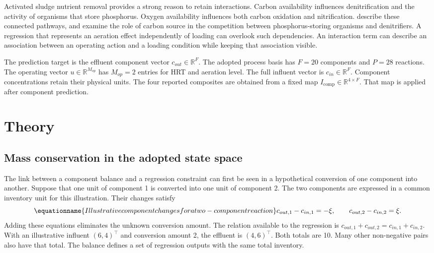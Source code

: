 Activated sludge nutrient removal provides a strong reason to retain interactions. Carbon availability influences denitrification and the activity of organisms that store phosphorus. Oxygen availability influences both carbon oxidation and nitrification. \citet{Wentzel1992} describe these connected pathways, and \citet{Guerrero2011} examine the role of carbon source in the competition between phosphorus-storing organisms and denitrifiers. A regression that represents an aeration effect independently of loading can overlook such dependencies. An interaction term can describe an association between an operating action and a loading condition while keeping that association visible.

The prediction target is the effluent component vector \(c_{out}\in\mathbb{R}^{F}\). The adopted process basis has \(F=20\) components and \(P=28\) reactions. The operating vector \(u\in\mathbb{R}^{M_{op}}\) has \(M_{op}=2\) entries for HRT and aeration level. The full influent vector is \(c_{in}\in\mathbb{R}^{F}\). Component concentrations retain their physical units. The four reported composites are obtained from a fixed map \(I_{\mathrm{comp}}\in\mathbb{R}^{4\times F}\). That map is applied after component prediction.

\section{Theory}

\subsection{Mass conservation in the adopted state space}

The link between a component balance and a regression constraint can first be seen in a hypothetical conversion of one component into another. Suppose that one unit of component 1 is converted into one unit of component 2. The two components are expressed in a common inventory unit for this illustration. Their changes satisfy
\begin{equation}
\equationname{Illustrative component changes for a two-component reaction}
\label{eq:icsor_scalar_inventory_example}
c_{out,1}-c_{in,1}=-\xi,
\qquad
c_{out,2}-c_{in,2}=\xi.
\end{equation}
Adding these equations eliminates the unknown conversion amount. The relation available to the regression is \(c_{out,1}+c_{out,2}=c_{in,1}+c_{in,2}\). With an illustrative influent \((6,4)^\top\) and conversion amount 2, the effluent is \((4,6)^\top\). Both totals are 10. Many other non-negative pairs also have that total. The balance defines a set of regression outputs with the same total inventory.

